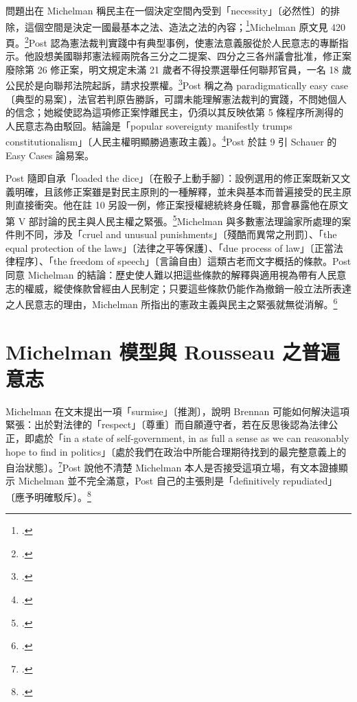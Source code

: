 問題出在 Michelman 稱民主在一個決定空間內受到「necessity」〔必然性〕的排除，這個空間是決定一國最基本之法、造法之法的內容；\footcite[430 \& n.7]{post1998}Michelman 原文見 420 頁。\footcite[420]{michelman1998}Post 認為憲法裁判實踐中有典型事例，使憲法意義服從於人民意志的專斷指示。他設想美國聯邦憲法經兩院各三分之二提案、四分之三各州議會批准，修正案廢除第 26 修正案，明文規定未滿 21 歲者不得投票選舉任何聯邦官員，一名 18 歲公民於是向聯邦法院起訴，請求投票權。\footcite[430--431 \& n.8]{post1998}Post 稱之為 paradigmatically easy case〔典型的易案〕，法官若判原告勝訴，可謂未能理解憲法裁判的實踐，不問她個人的信念；她縱使認為這項修正案悖離民主，仍須以其反映依第 5 條程序所測得的人民意志為由駁回。結論是「popular sovereignty manifestly trumps constitutionalism」〔人民主權明顯勝過憲政主義〕。\footcite[431 \& n.9]{post1998}Post 於註 9 引 Schauer 的 Easy Cases 論易案。

Post 隨即自承「loaded the dice」〔在骰子上動手腳〕：設例選用的修正案既新又文義明確，且該修正案雖是對民主原則的一種解釋，並未與基本而普遍接受的民主原則直接衝突。他在註 10 另設一例，修正案授權總統終身任職，那會暴露他在原文第 V 部討論的民主與人民主權之緊張。\footcite[431 n.10]{post1998}Michelman 與多數憲法理論家所處理的案件則不同，涉及「cruel and unusual punishments」〔殘酷而異常之刑罰〕、「the equal protection of the laws」〔法律之平等保護〕、「due process of law」〔正當法律程序〕、「the freedom of speech」〔言論自由〕這類古老而文字概括的條款。Post 同意 Michelman 的結論：歷史使人難以把這些條款的解釋與適用視為帶有人民意志的權威，縱使條款曾經由人民制定；只要這些條款仍能作為撤銷一般立法所表達之人民意志的理由，Michelman 所指出的憲政主義與民主之緊張就無從消解。\footcite[431 \& n.11]{post1998}

\section{Michelman 模型與 Rousseau 之普遍意志}
\label{sec:60_post-2}

Michelman 在文末提出一項「surmise」〔推測〕，說明 Brennan 可能如何解決這項緊張：出於對法律的「respect」〔尊重〕而自願遵守者，若在反思後認為法律公正，即處於「in a state of self-government, in as full a sense as we can reasonably hope to find in politics」〔處於我們在政治中所能合理期待找到的最完整意義上的自治狀態〕。\footcite[431--432 \& n.12]{post1998}Post 說他不清楚 Michelman 本人是否接受這項立場，有文本證據顯示 Michelman 並不完全滿意，Post 自己的主張則是「definitively repudiated」〔應予明確駁斥〕。\footcite[432]{post1998}

